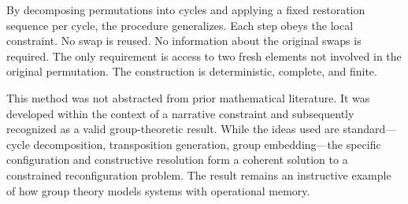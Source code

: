 By decomposing permutations into cycles and applying a fixed restoration sequence per cycle, the procedure generalizes. Each step obeys the local constraint. No swap is reused. No information about the original swaps is required. The only requirement is access to two fresh elements not involved in the original permutation. The construction is deterministic, complete, and finite.

This method was not abstracted from prior mathematical literature. It was developed within the context of a narrative constraint and subsequently recognized as a valid group-theoretic result. While the ideas used are standard—cycle decomposition, transposition generation, group embedding—the specific configuration and constructive resolution form a coherent solution to a constrained reconfiguration problem. The result remains an instructive example of how group theory models systems with operational memory.

